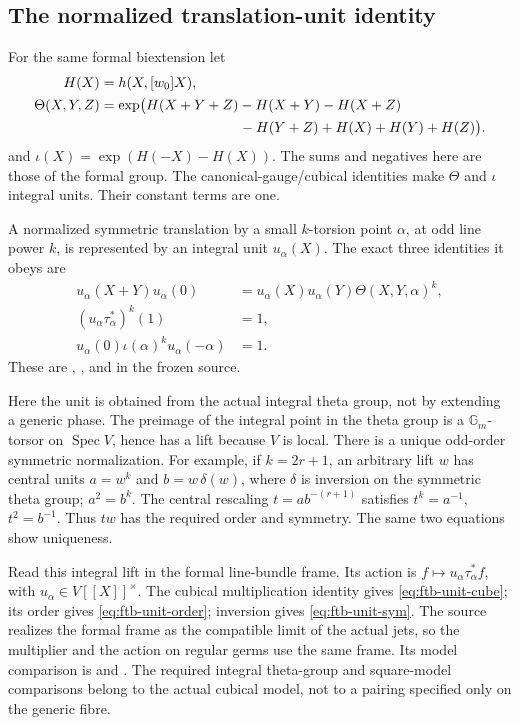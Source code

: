 \subsection{The normalized translation-unit identity}
\label{subsec:ftb-translation-unit-identity}

For the same formal biextension let
\[
\begin{aligned}
 H(X)&=h(X,[w_0]X),\\
 \Theta(X,Y,Z)&=\exp\bigl(H(X+Y+Z)-H(X+Y)-H(X+Z)\\
 &\hspace{35mm}-H(Y+Z)+H(X)+H(Y)+H(Z)\bigr).
\end{aligned}
\]
and
\(\iota(X)=\exp(H(-X)-H(X))\).
The sums and negatives here are those of the formal group.
The canonical-gauge/cubical identities make \(\Theta\) and \(\iota\)
integral units.  Their constant terms are one.

A normalized symmetric translation by a small \(k\)-torsion point
\(\alpha\), at odd line power \(k\), is represented by an integral
unit \(u_\alpha(X)\).
The exact three identities it obeys are
\begin{align}
 u_\alpha(X+Y)u_\alpha(0)
   &=u_\alpha(X)u_\alpha(Y)\Theta(X,Y,\alpha)^k,
                                                        \label{eq:ftb-unit-cube}\\
 (u_\alpha\tau_\alpha^*)^k(1)&=1,             \label{eq:ftb-unit-order}\\
 u_\alpha(0)\iota(\alpha)^k u_\alpha(-\alpha)&=1.
                                                        \label{eq:ftb-unit-sym}
\end{align}
These are , , and
 in the frozen source.

Here the unit is obtained from the actual integral theta group, not
by extending a generic phase.
The preimage of the integral point in the theta group is a
\(\mathbb G_m\)-torsor on \(\operatorname{Spec}V\), hence has a lift
because \(V\) is local.
There is a unique odd-order symmetric normalization.
For example, if \(k=2r+1\), an arbitrary lift \(w\) has central units
\(a=w^k\) and \(b=w\,\delta(w)\), where \(\delta\) is inversion on
the symmetric theta group; \(a^2=b^k\).
The central rescaling \(t=a b^{-(r+1)}\) satisfies
\(t^k=a^{-1}\), \(t^2=b^{-1}\).
Thus \(tw\) has the required order and symmetry.
The same two equations show uniqueness.

Read this integral lift in the formal line-bundle frame.
Its action is \(f\mapsto u_\alpha\tau_\alpha^*f\), with
\(u_\alpha\in V[[X]]^\times\).
The cubical multiplication identity gives
\eqref{eq:ftb-unit-cube}; its order gives
\eqref{eq:ftb-unit-order}; inversion gives
\eqref{eq:ftb-unit-sym}.
The source realizes the formal frame as the compatible limit of the
actual jets, so the multiplier and the action on regular germs use
the same frame.
Its model comparison is
and .
The required integral theta-group and square-model comparisons belong
to the actual cubical model, not to a pairing specified only on the
generic fibre.

